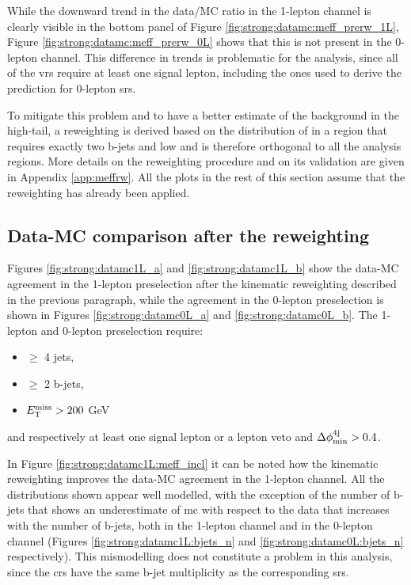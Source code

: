 While the downward trend in the data/MC ratio in the 1-lepton channel is clearly visible in the bottom panel of Figure \ref{fig:strong:datamc:meff_prerw_1L},
Figure \ref{fig:strong:datamc:meff_prerw_0L} shows that this is not present in the 0-lepton channel.
This difference in trends is problematic for the analysis, since all of the \glspl{vr} require at least one signal lepton, 
including the ones used to derive the prediction for 0-lepton \glspl{sr}. 

To mitigate this problem and to have a better estimate of the background in the high-\meff tail, a reweighting is derived 
based on the distribution of \meff in a region that requires exactly two b-jets and low \mtb and is therefore
 orthogonal to all the analysis regions. More details on the reweighting procedure and on its validation are given in Appendix \ref{app:meffrw}.
All the plots in the rest of this section assume that the reweighting has already been applied. 


\subsection*{Data-MC comparison after the reweighting}

Figures \ref{fig:strong:datamc1L_a} and \ref{fig:strong:datamc1L_b} show the data-MC agreement in the 1-lepton preselection after the 
kinematic reweighting described in the previous paragraph, while 
the agreement in the 0-lepton preselection is shown in Figures \ref{fig:strong:datamc0L_a} and \ref{fig:strong:datamc0L_b}.
The 1-lepton and 0-lepton preselection require:
\begin{itemize}
\item $\geq$ 4 jets,
\item $\geq$ 2 b-jets,
\item $E_{\rm T}^{\mathrm{miss}} > 200$ GeV
\end{itemize}
and respectively at least one signal lepton or a lepton veto and $\Delta\phi_{\rm{min}}^{4{\rm{j}}} > 0.4$.

In Figure \ref{fig:strong:datamc1L:meff_incl} it can be noted how the kinematic reweighting improves the data-MC agreement in
the 1-lepton channel. 
All the distributions shown appear well modelled, with the exception of the number of b-jets 
that shows an underestimate of \gls{mc} with respect to the data that increases with the number of b-jets, both in 
the 1-lepton channel and in the 0-lepton channel 
(Figures \ref{fig:strong:datamc1L:bjets_n} and \ref{fig:strong:datamc0L:bjets_n} respectively).
This mismodelling does not constitute a problem in this analysis, 
since the \glspl{cr} have the same b-jet multiplicity as the corresponding \glspl{sr}.



